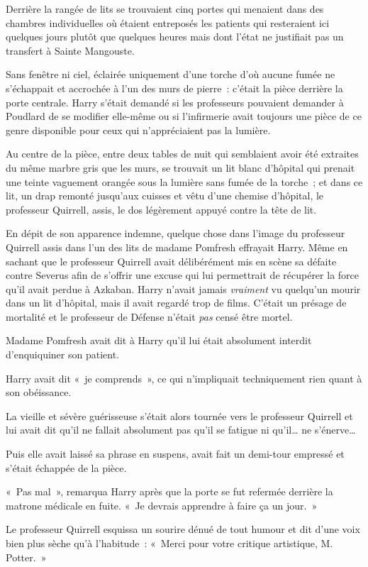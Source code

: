 Derrière la rangée de lits se trouvaient cinq portes qui menaient dans des chambres individuelles où étaient entreposés les patients qui resteraient ici quelques jours plutôt que quelques heures mais dont l'état ne justifiait pas un transfert à Sainte Mangouste.

Sans fenêtre ni ciel, éclairée uniquement d'une torche d'où aucune fumée ne s'échappait et accrochée à l'un des murs de pierre~: c'était la pièce derrière la porte centrale.
Harry s'était demandé si les professeurs pouvaient demander à Poudlard de se modifier elle-même ou si l'infirmerie avait toujours une pièce de ce genre disponible pour ceux qui n'appréciaient pas la lumière.

Au centre de la pièce, entre deux tables de nuit qui semblaient avoir été extraites du même marbre gris que les murs, se trouvait un lit blanc d'hôpital qui prenait une teinte vaguement orangée sous la lumière sans fumée de la torche~; et dans ce lit, un drap remonté jusqu'aux cuisses et vêtu d'une chemise d'hôpital, le professeur Quirrell, assis, le dos légèrement appuyé contre la tête de lit.

En dépit de son apparence indemne, quelque chose dans l'image du professeur Quirrell assis dans l'un des lits de madame Pomfresh effrayait Harry.
Même en sachant que le professeur Quirrell avait délibérément mis en scène sa défaite contre Severus afin de s'offrir une excuse qui lui permettrait de récupérer la force qu'il avait perdue à Azkaban.
Harry n'avait jamais \emph{vraiment} vu quelqu'un mourir dans un lit d'hôpital, mais il avait regardé trop de films.
C'était un présage de mortalité et le professeur de Défense n'était \emph{pas} censé être mortel.

Madame Pomfresh avait dit à Harry qu'il lui était absolument interdit d'enquiquiner son patient.

Harry avait dit «~je comprends~», ce qui n'impliquait techniquement rien quant à son obéissance.

La vieille et sévère guérisseuse s'était alors tournée vers le professeur Quirrell et lui avait dit qu'il ne fallait absolument pas qu'il se fatigue ni qu'il… ne s'énerve…

Puis elle avait laissé sa phrase en suspens, avait fait un demi-tour empressé et s'était échappée de la pièce.

«~Pas mal~», remarqua Harry après que la porte se fut refermée derrière la matrone médicale en fuite.
«~Je devrais apprendre à faire ça un jour.~»

Le professeur Quirrell esquissa un sourire dénué de tout humour et dit d'une voix bien plus sèche qu'à l'habitude~: «~Merci pour votre critique artistique, M. Potter.~»

